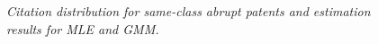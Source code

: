 \documentclass[letterpaper,12pt]{article}
\theoremstyle{definition}
\begin{document}
\begin{figure}[htb]\centering \captionsetup{width=5.8in}
    \caption{\label{fig:GMM_MLE}\textit{Citation distribution for same-class abrupt patents and estimation results for MLE and GMM.}}
\end{figure}
\end{document}
